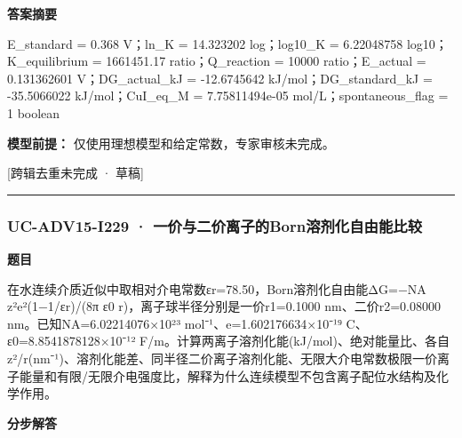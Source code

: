\documentclass[UTF8,11pt,a4paper]{ctexart}
\begin{document}
\noindent\textbf{答案摘要}\par
E\_standard = 0.368 V；ln\_K = 14.323202 log；log10\_K = 6.22048758 log10；K\_equilibrium = 1661451.17 ratio；Q\_reaction = 10000 ratio；E\_actual = 0.131362601 V；DG\_actual\_kJ = -12.6745642 kJ/mol；DG\_standard\_kJ = -35.5066022 kJ/mol；CuI\_eq\_M = 7.75811494e-05 mol/L；spontaneous\_flag = 1 boolean\par
\noindent\textbf{模型前提：}
仅使用理想模型和给定常数，专家审核未完成。\par
\noindent\textcolor{red!65!black}{[跨辑去重未完成 · 草稿]} \par
\medskip\hrule\medskip
{}
\subsubsection*{UC-ADV15-I229 · 一价与二价离子的Born溶剂化自由能比较}
\noindent\textbf{题目}\par
在水连续介质近似中取相对介电常数εr=78.50，Born溶剂化自由能ΔG=−NA z²e²(1−1/εr)/(8π ε0 r)，离子球半径分别是一价r1=0.1000 nm、二价r2=0.08000 nm。已知NA=6.02214076×10²³ mol⁻¹、e=1.602176634×10⁻¹⁹ C、ε0=8.8541878128×10⁻¹² F/m。计算两离子溶剂化能(kJ/mol)、绝对能量比、各自z²/r(nm⁻¹)、溶剂化能差、同半径二价离子溶剂化能、无限大介电常数极限一价离子能量和有限/无限介电强度比，解释为什么连续模型不包含离子配位水结构及化学作用。\par
\medskip\noindent\textbf{分步解答}
\end{document}
